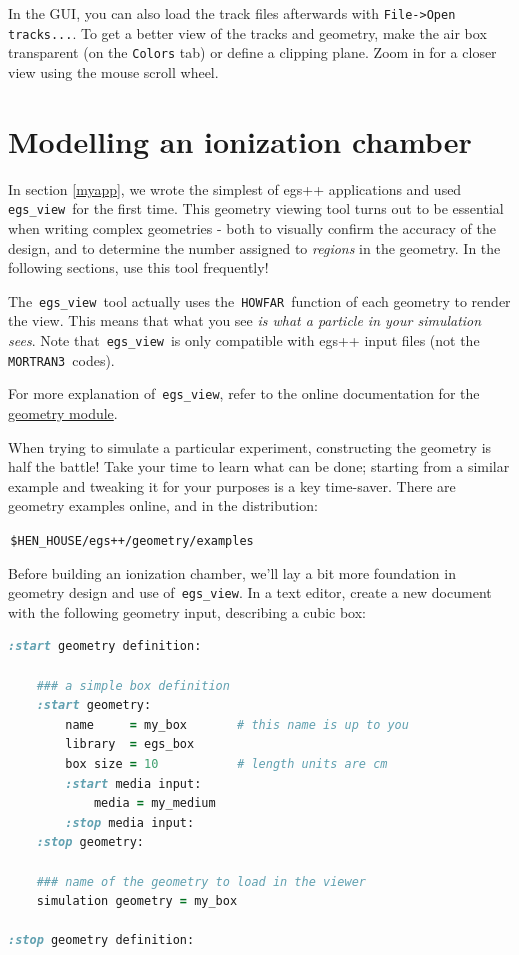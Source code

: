 \documentclass[12pt,twoside]{article}
\begin{document}
In the GUI, you can also load the track files afterwards with \Verb+File->Open tracks...+. To get a better view of the tracks and geometry, make the air box transparent (on the \Verb+Colors+ tab) or define a clipping plane. Zoom in for a closer view using the mouse scroll wheel.

\clearpage
\section{Modelling an ionization chamber}
In section \ref{myapp}, we wrote the simplest of egs++ applications and used
\,\Verb|egs_view|\, for the first time. This geometry viewing tool turns out to be
essential when writing complex geometries - both to visually confirm the
accuracy of the design, and to determine the number assigned to \textit{regions}
in the geometry. In the following sections, use this tool frequently!

The \,\Verb|egs_view|\, tool actually uses the \,\Verb|HOWFAR|\,
function of each geometry to render the view. This means that what you see \textit{is
what a particle in your simulation sees}. Note that \,\Verb|egs_view|\, is only
compatible with egs++ input files (not the \,\Verb|MORTRAN3|\, codes).

For more explanation of \,\Verb|egs_view|, refer to the online documentation
for the
\href{http://nrc-cnrc.github.io/EGSnrc/doc/pirs898/group__Geometry.html#geometry_view}{geometry module}.

When trying to simulate a particular experiment, constructing the geometry is
half the battle! Take your time to learn what can be done; starting from
a similar example and tweaking it for your purposes is a key time-saver.
There are geometry examples online, and in the distribution:

\,\Verb|$HEN_HOUSE/egs++/geometry/examples|\,

Before building an ionization chamber, we'll lay a bit more foundation in geometry design and use of \,\Verb|egs_view|. In a text
editor, create a new document with the following geometry input, describing
a cubic box:

{\small
\begin{lstlisting}[language=ruby,backgroundcolor=\color{white}]
:start geometry definition:

    ### a simple box definition
    :start geometry:
        name     = my_box       # this name is up to you
        library  = egs_box
        box size = 10           # length units are cm
        :start media input:
            media = my_medium
        :stop media input:
    :stop geometry:

    ### name of the geometry to load in the viewer
    simulation geometry = my_box

:stop geometry definition:
\end{lstlisting}
}
\end{document}
